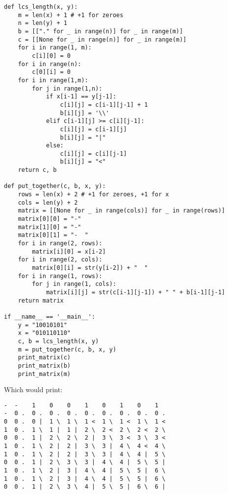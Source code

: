 \documentclass[11pt]{article}
\begin{document}
\begin{enumerate}
\begin{verbatim}
def lcs_length(x, y):
    m = len(x) + 1 # +1 for zeroes
    n = len(y) + 1
    b = [["." for _ in range(n)] for _ in range(m)]
    c = [[None for _ in range(n)] for _ in range(m)]
    for i in range(1, m):
        c[i][0] = 0
    for i in range(n):
        c[0][i] = 0
    for i in range(1,m):
        for j in range(1,n):
            if x[i-1] == y[j-1]:
                c[i][j] = c[i-1][j-1] + 1
                b[i][j] = '\\'
            elif c[i-1][j] >= c[i][j-1]:
                c[i][j] = c[i-1][j]
                b[i][j] = "|"
            else:
                c[i][j] = c[i][j-1]
                b[i][j] = "<"
    return c, b

def put_together(c, b, x, y):
    rows = len(x) + 2 # +1 for zeroes, +1 for x
    cols = len(y) + 2
    matrix = [[None for _ in range(cols)] for _ in range(rows)]
    matrix[0][0] = "-"
    matrix[1][0] = "-"
    matrix[0][1] = "-  "
    for i in range(2, rows):
        matrix[i][0] = x[i-2]
    for i in range(2, cols):
        matrix[0][i] = str(y[i-2]) + "  "
    for i in range(1, rows):
        for j in range(1, cols):
            matrix[i][j] = str(c[i-1][j-1]) + " " + b[i-1][j-1]
    return matrix

if __name__ == '__main__':
    y = "10010101"
    x = "010110110"
    c, b = lcs_length(x, y)
    m = put_together(c, b, x, y)
    print_matrix(c)
    print_matrix(b)
    print_matrix(m)
    \end{verbatim}
    Which would print:
    \begin{verbatim}
-  -    1    0    0    1    0    1    0    1   
-  0 .  0 .  0 .  0 .  0 .  0 .  0 .  0 .  0 . 
0  0 .  0 |  1 \  1 \  1 <  1 \  1 <  1 \  1 < 
1  0 .  1 \  1 |  1 |  2 \  2 <  2 \  2 <  2 \ 
0  0 .  1 |  2 \  2 \  2 |  3 \  3 <  3 \  3 < 
1  0 .  1 \  2 |  2 |  3 \  3 |  4 \  4 <  4 \ 
1  0 .  1 \  2 |  2 |  3 \  3 |  4 \  4 |  5 \ 
0  0 .  1 |  2 \  3 \  3 |  4 \  4 |  5 \  5 | 
1  0 .  1 \  2 |  3 |  4 \  4 |  5 \  5 |  6 \ 
1  0 .  1 \  2 |  3 |  4 \  4 |  5 \  5 |  6 \ 
0  0 .  1 |  2 \  3 \  4 |  5 \  5 |  6 \  6 | 
    \end{verbatim}
    

\end{enumerate}
\end{document}
